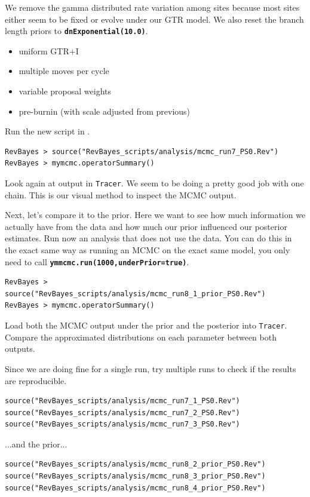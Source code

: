 \documentclass[11pt]{article}
\newcommand{\cl}[1]{{\texttt{\textbf{#1}}}}
\begin{document}
We remove the gamma distributed rate variation among sites because most sites either seem to be fixed or evolve under our GTR model.
We also reset the branch length priors to \cl{dnExponential(10.0)}.
\begin{itemize}
\item{uniform GTR+I}
\item{multiple moves per cycle}
\item{variable proposal weights}
\item{pre-burnin (with scale adjusted from previous)}
\end{itemize}
Run the new script in \RevBayes.
{\tt \begin{snugshade*}
\begin{lstlisting}
RevBayes > source("RevBayes_scripts/analysis/mcmc_run7_PS0.Rev")
RevBayes > mymcmc.operatorSummary()
\end{lstlisting}
\end{snugshade*}}
Look again at output in \verb!Tracer!.
We seem to be doing a pretty good job with one chain.
This is our visual method to inspect the MCMC output. 

Next, let's compare it to the prior.
Here we want to see how much information we actually have from the data and how much our prior influenced our posterior estimates.
Run now an analysis that does not use the data.
You can do this in \RevBayes the exact same way as running an MCMC on the exact same model, you only need to call \cl{ymmcmc.run(1000,underPrior=true)}.
{\tt \begin{snugshade*}
\begin{lstlisting}
RevBayes > source("RevBayes_scripts/analysis/mcmc_run8_1_prior_PS0.Rev")
RevBayes > mymcmc.operatorSummary()
\end{lstlisting}
\end{snugshade*}}
Load both the MCMC output under the prior and the posterior into \verb!Tracer!.
Compare the approximated distributions on each parameter between both outputs.

Since we are doing fine for a single run, try multiple runs to check if the results are reproducible.
{\tt \begin{snugshade*}
\begin{lstlisting}
source("RevBayes_scripts/analysis/mcmc_run7_1_PS0.Rev")
source("RevBayes_scripts/analysis/mcmc_run7_2_PS0.Rev")
source("RevBayes_scripts/analysis/mcmc_run7_3_PS0.Rev")
\end{lstlisting}
\end{snugshade*}}
...and the prior...
{\tt \begin{snugshade*}
\begin{lstlisting}
source("RevBayes_scripts/analysis/mcmc_run8_2_prior_PS0.Rev")
source("RevBayes_scripts/analysis/mcmc_run8_3_prior_PS0.Rev")
source("RevBayes_scripts/analysis/mcmc_run8_4_prior_PS0.Rev")
\end{lstlisting}
\end{snugshade*}}
\end{document}
